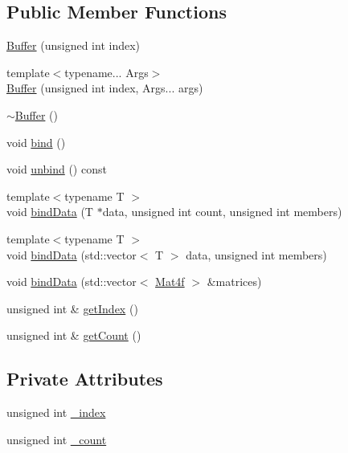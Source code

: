 \subsection*{Public Member Functions}
\begin{DoxyCompactItemize}
\item 
\hyperlink{classpcs_1_1rend_1_1Buffer_add9c4196c80605e47170fa37ad7eef50}{Buffer} (unsigned int index)
\item 
{\footnotesize template$<$typename... Args$>$ }\\\hyperlink{classpcs_1_1rend_1_1Buffer_a4ac6db7b29dd6a33d1f65b0c491a033f}{Buffer} (unsigned int index, Args... args)
\item 
\hyperlink{classpcs_1_1rend_1_1Buffer_a38bfdd852e494d21e430b2a0007021d4}{$\sim$\+Buffer} ()
\item 
void \hyperlink{classpcs_1_1rend_1_1Buffer_a1be9c6c19cee147e580c8d1038a664a9}{bind} ()
\item 
void \hyperlink{classpcs_1_1rend_1_1Buffer_ae50fade1bf8340f6db27af4bad5a09ba}{unbind} () const
\item 
{\footnotesize template$<$typename T $>$ }\\void \hyperlink{classpcs_1_1rend_1_1Buffer_a3e8a8fa6bbd51354ef27e86151d64022}{bind\+Data} (T $\ast$data, unsigned int count, unsigned int members)
\item 
{\footnotesize template$<$typename T $>$ }\\void \hyperlink{classpcs_1_1rend_1_1Buffer_ac121dc511109324c3d063799bbe8c81c}{bind\+Data} (std\+::vector$<$ T $>$ data, unsigned int members)
\item 
void \hyperlink{classpcs_1_1rend_1_1Buffer_a000af3de51f51ff6443da7ee4bdb0fe0}{bind\+Data} (std\+::vector$<$ \hyperlink{structpcs_1_1Mat4f}{Mat4f} $>$ \&matrices)
\item 
unsigned int \& \hyperlink{classpcs_1_1rend_1_1Buffer_a7825820bbf1227e6b94867523c6333fa}{get\+Index} ()
\item 
unsigned int \& \hyperlink{classpcs_1_1rend_1_1Buffer_a6b946389de081d61317561addc797356}{get\+Count} ()
\end{DoxyCompactItemize}
\subsection*{Private Attributes}
\begin{DoxyCompactItemize}
\item 
unsigned int \hyperlink{classpcs_1_1rend_1_1Buffer_ae651e17a3f64d982b2bd1e39e91bc89c}{\+\_\+index}
\item 
unsigned int \hyperlink{classpcs_1_1rend_1_1Buffer_a12efdd79f91856672f8c8dc8af0306c4}{\+\_\+count}
\end{DoxyCompactItemize}

